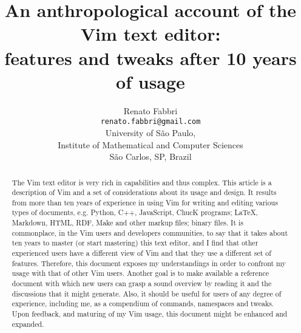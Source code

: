 \documentclass{article}
\begin{document}
\title{An anthropological account of the Vim text editor:\\
features and tweaks after 10 years of usage}
\author{Renato Fabbri\\
\texttt{renato.fabbri@gmail.com}\\
University of São Paulo,\\
Institute of Mathematical and Computer Sciences\\
São Carlos, SP, Brazil
}
\maketitle
\begin{abstract}
The Vim text editor is very rich in capabilities
and thus complex.
This article is a description of Vim
and a set of considerations about its usage and design.
It results from more than ten years of experience
in using Vim for writing and editing various types of documents,
e.g. Python, C++, JavaScript, ChucK programs;
\LaTeX, Markdown, HTML, RDF, Make and other markup files;  %
binary files.
It is commonplace, in the Vim users and developers communities,
to say that it takes about ten years to master (or start mastering)
this text editor, and I find that other experienced users
have a different view of Vim and that they use a different
set of features.
Therefore, this document exposes my understandings in order
to confront my usage with that of other Vim users.
Another goal is
to make available a reference document with which new users
can grasp a sound overview by reading it and the discussions that
it might generate.
Also, it should be useful for users of any degree of experience,
including me, as a compendium of commands, namespaces and tweaks.
Upon feedback, and maturing of my Vim usage,
this document might be enhanced and expanded.
\end{abstract}
\end{document}
